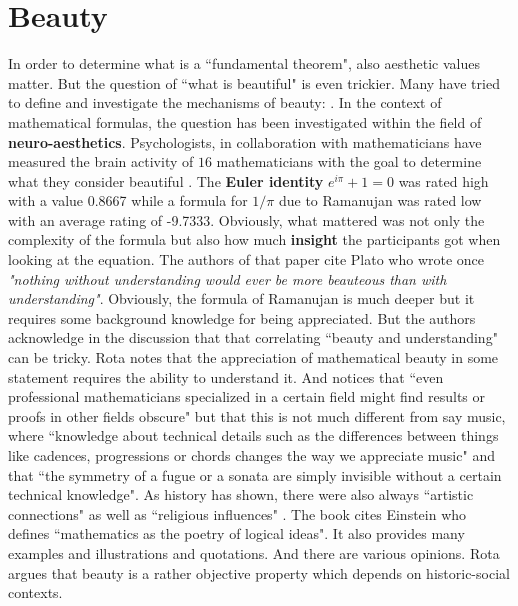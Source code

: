 \documentclass[12pt]{amsart}
\newcounter{example}    \def\example#1{ \item \fontsize{12}{15} \selectfont #1 \fontsize{12}{15} \selectfont }
\begin{document}
\section*{Beauty} 

In order to determine what is a ``fundamental theorem", also 
aesthetic values matter. But the question of ``what is beautiful" is even trickier.  
Many have tried to define and investigate the mechanisms of beauty:
\cite{HardyApology,Wells1,Wells2,RotaBeauty,SinclairMathBeauty,AharoniBeauty,MontanoExplainingBeauty}. 
In the context of mathematical formulas, the question has been investigated within the field of
{\bf neuro-aesthetics}. Psychologists, in collaboration with mathematicians have measured
the brain activity of $16$ mathematicians with the goal to determine what they consider
beautiful \cite{ZRBA}. The {\bf Euler identity} $e^{i \pi} + 1 = 0$ was rated high with a value
0.8667 while a formula for $1/\pi$ due to Ramanujan was rated low with an average rating
of -9.7333. Obviously, what mattered was not only the complexity of the formula but also how
much {\bf insight} the participants got when looking at the equation. The authors of
that paper cite Plato who wrote once {\it "nothing without understanding would ever be 
more beauteous than with understanding"}. Obviously, the formula of Ramanujan is much
deeper but it requires some background knowledge for being appreciated.
But the authors acknowledge in the discussion that that correlating 
``beauty and understanding" can be tricky. 
Rota \cite{RotaBeauty} notes that the appreciation of mathematical beauty in some statement
requires the ability to understand it. And \cite{MontanoExplainingBeauty} notices that
``even professional mathematicians specialized in a certain field might find results or proofs in 
other fields obscure" but that this is not much different from say music, where ``knowledge about
technical details such as the differences between things like cadences, progressions or chords changes 
the way we appreciate music" and that ``the symmetry of a fugue or a sonata are simply invisible without 
a certain technical knowledge". As history has shown, there were also
always ``artistic connections" \cite{Gamwell,BruterArt} as well as ``religious influences"
\cite{Livio2009,Skinner}. The book \cite{Gamwell} cites Einstein who defines 
``mathematics as the poetry of logical ideas". It also provides many examples and
illustrations and quotations. And there are various opinions.  Rota argues that
beauty is a rather objective property which depends on historic-social contexts. 
\end{document}
